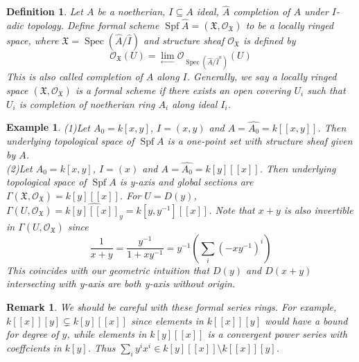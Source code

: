 \documentclass{ctexart}
\newtheorem{definition}{Definition}[section]
\newtheorem{remark}{Remark}[section]
\newtheorem{example}{Example}[section]
\newcommand{\spec}{\operatorname{Spec}}
\newcommand{\spf}{\operatorname{Spf}}
\newcommand{\inverselimit}{\underset{\longleftarrow}{\lim}}
\begin{document}
\begin{definition}
    Let $A$ be a noetherian, $I \subseteq A$ ideal, $\widehat{A}$ completion of $A$ under $I$-adic topology.
    Define formal scheme $\spf \widehat{A} = (\mathfrak{X}, \mathcal{O}_{\mathfrak{X}})$ to be a locally ringed space,
    where $\mathfrak{X} = \spec (\widehat{A}/\widehat{I})$ and structure sheaf $\mathcal{O}_{\mathfrak{X}}$ is defined by
    \begin{equation}
        \mathcal{O}_{\mathfrak{X}}(U) = \inverselimit \mathcal{O}_{\spec (\widehat{A}/\widehat{I}^{n})}(U)
    \end{equation}
    This is also called completion of $A$ along $I$.
    Generally, we say a locally ringed space $(\mathfrak{X}, \mathcal{O}_{\mathfrak{X}})$ is a formal scheme if there exists an open covering $U_{i}$ such that $U_{i}$ is completion of noetherian ring $A_{i}$ along ideal $I_{i}$.
\end{definition}
\begin{example}
    (1)Let $A_{0} = k[x, y]$, $I = (x, y)$ and $A = \widehat{A_{0}} = k[[x, y]]$.
    Then underlying topological space of $\spf A$ is a one-point set with structure sheaf given by $A$. \\
    (2)Let $A_{0} = k[x, y]$, $I = (x)$ and $A = \widehat{A_{0}} = k[y][[x]]$.
    Then underlying topological space of $\spf A$ is y-axis and global sections are $\Gamma(\mathfrak{X}, \mathcal{O}_{\mathfrak{X}}) = k[y][[x]]$.
    For $U = D(y)$, $\Gamma(U, \mathcal{O}_{\mathfrak{X}}) = \widehat{k[y][[x]]_{y}} = k[y, y^{-1}][[x]]$.
    Note that $x + y$ is also invertible in $\Gamma(U, \mathcal{O}_{\mathfrak{X}})$ since
    \begin{equation}
        \frac{1}{x + y} = \frac{y^{-1}}{1 + xy^{-1}} = y^{-1}(\sum_{i} (-xy^{-1})^{i})
    \end{equation}
    This coincides with our geometric intuition that $D(y)$ and $D(x + y)$ intersecting with y-axis are both y-axis without origin.
\end{example}
\begin{remark}
    We should be careful with these formal series rings.
    For example, $ k[[x]][y] \subsetneq k[y][[x]]$ since elements in $k[[x]][y]$ would have a bound for degree of $y$,
    while elements in $k[y][[x]]$ is a convergent power series with coeffcients in $k[y]$.
    Thus $\sum_{i} y^{i}x^{i}\in k[y][[x]] \setminus k[[x]][y]$.
    \label{remark:subtle_difference_between_formal_series_rings}
\end{remark}
\end{document}
